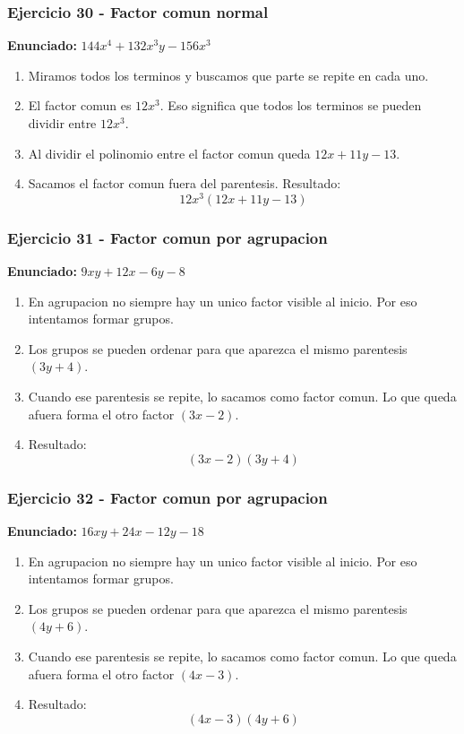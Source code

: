 \documentclass[11pt,a4paper]{article}
\begin{document}
\vspace{0.2cm}
\subsubsection*{Ejercicio 30 - Factor comun normal}
\textbf{Enunciado:} $ 144 x^{4} + 132 x^{3} y - 156 x^{3} $\par
\begin{enumerate}[leftmargin=2em]
\item Miramos todos los terminos y buscamos que parte se repite en cada uno.
\item El factor comun es \(12 x^{3}\). Eso significa que todos los terminos se pueden dividir entre \(12 x^{3}\).
\item Al dividir el polinomio entre el factor comun queda \(12 x + 11 y - 13\).
\item Sacamos el factor comun fuera del parentesis. Resultado: \[\boxed{12 x^{3}\left(12 x + 11 y - 13\right)}\]
\end{enumerate}

\vspace{0.2cm}
\subsubsection*{Ejercicio 31 - Factor comun por agrupacion}
\textbf{Enunciado:} $ 9 x y + 12 x - 6 y - 8 $\par
\begin{enumerate}[leftmargin=2em]
\item En agrupacion no siempre hay un unico factor visible al inicio. Por eso intentamos formar grupos.
\item Los grupos se pueden ordenar para que aparezca el mismo parentesis \((3 y + 4)\).
\item Cuando ese parentesis se repite, lo sacamos como factor comun. Lo que queda afuera forma el otro factor \((3 x - 2)\).
\item Resultado: \[\boxed{\left(3 x - 2\right)\left(3 y + 4\right)}\]
\end{enumerate}

\vspace{0.2cm}
\subsubsection*{Ejercicio 32 - Factor comun por agrupacion}
\textbf{Enunciado:} $ 16 x y + 24 x - 12 y - 18 $\par
\begin{enumerate}[leftmargin=2em]
\item En agrupacion no siempre hay un unico factor visible al inicio. Por eso intentamos formar grupos.
\item Los grupos se pueden ordenar para que aparezca el mismo parentesis \((4 y + 6)\).
\item Cuando ese parentesis se repite, lo sacamos como factor comun. Lo que queda afuera forma el otro factor \((4 x - 3)\).
\item Resultado: \[\boxed{\left(4 x - 3\right)\left(4 y + 6\right)}\]
\end{enumerate}
\end{document}
